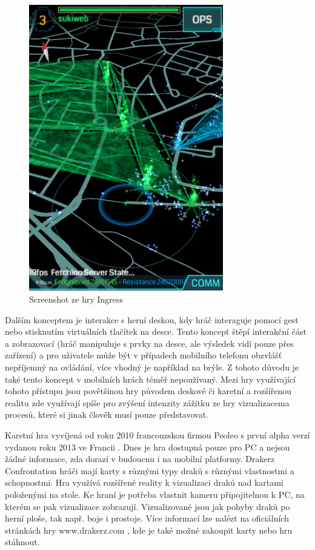 \documentclass[twoside,12pt]{article}
\begin{document}
\begin{figure}[H]
    \includegraphics[width=320px, center]{images/ingress.jpg}
    \caption{Screenshot ze hry Ingress}
    \label{ingress_screenshot}
\end{figure}

Dalším konceptem je interakce s herní deskou, kdy hráč interaguje pomocí gest nebo stisknutím virtuálních tlačítek na desce. Tento koncept štěpí interakční část a zobrazovací (hráč manipuluje s prvky na desce, ale výsledek vidí pouze přes zařízení) a pro uživatele může být v případech mobilního telefonu obzvlášť nepříjemný na ovládání, více vhodný je například na brýle. Z tohoto důvodu je také tento koncept v mobilních hrách téměř nepoužívaný. Mezi hry využívající tohoto přístupu jsou povětšinou hry původem deskové či karetní a rozšířenou realitu zde využívají spíše pro zvýšení intenzity zážitku ze hry vizualizacema procesů, které si jinak člověk musí pouze představovat. 

%
%

Karetní hra vyvíjená od roku 2010 francouzskou firmou Peoleo s první alpha verzí vydanou roku 2013 ve Francii \cite{venturebeat}. Dnes je hra dostupná pouze pro PC a nejsou žádné informace, zda dorazí v budoucnu i na mobilní platformy. Drakerz Confrontation hráči mají karty s různými typy draků s různými vlastnostmi a schopnostmi. Hra využívá rozšířené reality k vizualizaci draků nad kartami položenými na stole. Ke hraní je potřeba vlastnit kameru připojitelnou k PC, na kterém se pak vizualizace zobrazují. Vizualizované jsou jak pohyby draků po herní ploše, tak např. boje i prostoje. Více informací lze nalézt na oficiálních stránkách hry www.drakerz.com \cite{peoleo_about}, kde je také možné zakoupit karty nebo hru stáhnout.
\end{document}
